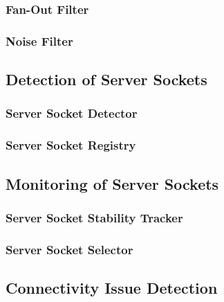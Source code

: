 \subsubsection{Fan-Out Filter}
\subsubsection{Noise Filter}

\subsection{Detection of Server Sockets}
\subsubsection{Server Socket Detector}

\subsubsection{Server Socket Registry}

\subsection{Monitoring of Server Sockets}
\subsubsection{Server Socket Stability Tracker}
\subsubsection{Server Socket Selector}

\subsection{Connectivity Issue Detection}

